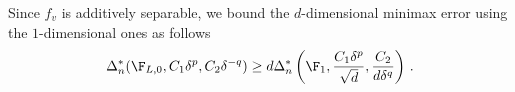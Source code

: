 Since $f_v$ is additively separable, we bound the $d$-dimensional minimax error using the $1$-dimensional ones as follows
%
%
%
\begin{align*}
\Delta_n^*(\F_{L,0}, C_1 \delta^p ,C_2 \delta^{-q}) \ge d \Delta_n^{*}\left(\F_1,\frac{C_1\delta^p}{\sqrt d}, \frac{C_2}{d\delta^q}\right)\,.
\end{align*}

